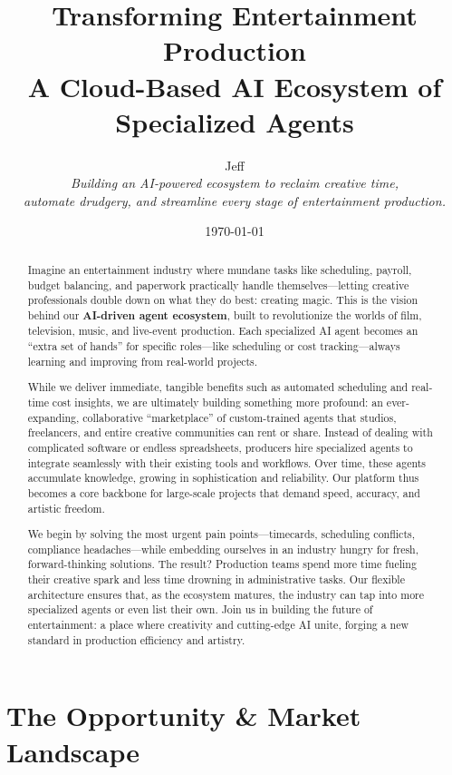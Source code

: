 \documentclass[11pt]{article}
\title{\bfseries Transforming Entertainment Production \\
A Cloud-Based AI Ecosystem of Specialized Agents}
\author{
\begin{minipage}[t]{\textwidth}
    \centering
    Jeff\\
    \vspace{5pt}
    \small \emph{Building an AI-powered ecosystem to reclaim creative time,\\
    automate drudgery, and streamline every stage of entertainment production.}
\end{minipage}
}
\date{\today}
\begin{document}
\maketitle

\begin{abstract}
Imagine an entertainment industry where mundane tasks like scheduling, payroll, budget balancing, and paperwork practically handle themselves—letting creative professionals double down on what they do best: creating magic. This is the vision behind our \textbf{AI-driven agent ecosystem}, built to revolutionize the worlds of film, television, music, and live-event production. Each specialized AI agent becomes an “extra set of hands” for specific roles—like scheduling or cost tracking—always learning and improving from real-world projects.

While we deliver immediate, tangible benefits such as automated scheduling and real-time cost insights, we are ultimately building something more profound: an ever-expanding, collaborative “marketplace” of custom-trained agents that studios, freelancers, and entire creative communities can rent or share. Instead of dealing with complicated software or endless spreadsheets, producers hire specialized agents to integrate seamlessly with their existing tools and workflows. Over time, these agents accumulate knowledge, growing in sophistication and reliability. Our platform thus becomes a core backbone for large-scale projects that demand speed, accuracy, and artistic freedom.

We begin by solving the most urgent pain points—timecards, scheduling conflicts, compliance headaches—while embedding ourselves in an industry hungry for fresh, forward-thinking solutions. The result? Production teams spend more time fueling their creative spark and less time drowning in administrative tasks. Our flexible architecture ensures that, as the ecosystem matures, the industry can tap into more specialized agents or even list their own. Join us in building the future of entertainment: a place where creativity and cutting-edge AI unite, forging a new standard in production efficiency and artistry.
\end{abstract}

\newpage
\tableofcontents
\newpage

\section{The Opportunity \& Market Landscape}
\end{document}
